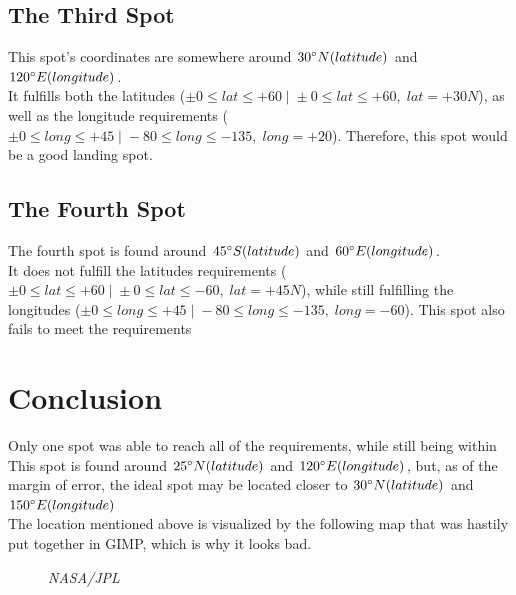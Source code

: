 \documentclass{article}
\newcommand*{\captionsource}[2]{%
    \caption*{%
        \noindent%
        {\fontsize{8pt}{8pt}%
            \selectfont \noindent \null \hfill \emph{#2}%
        }%
        \\\hspace{\linewidth}%
        {\fontsize{10pt}{10pt}%
            \selectfont \noindent \centering{#1}%
        }%
    }%
}
\begin{document}
\subsection{The Third Spot}
This spot's coordinates are somewhere around \(30 \degree N (latitude)\) and \(120 \degree E (longitude)\). \\
It fulfills both the latitudes (\(\pm 0 \leq lat \leq +60 \;|\; \pm 0 \leq lat \leq +60,\; lat = +30 N\)), as well as the longitude requirements (\(  \pm 0 \leq long \leq +45 \;|\; -80 \leq long \leq -135,\; long = +20 \)).
Therefore, this spot would be a good landing spot.

\subsection{The Fourth Spot}
The fourth spot is found around \(45 \degree S (latitude)\) and \(60 \degree E (longitude)\). \\
It does not fulfill the latitudes requirements (\(\pm 0 \leq lat \leq +60 \;|\; \pm 0 \leq lat \leq -60,\; lat = +45 N\)), while still fulfilling the longitudes (\(  \pm 0 \leq long \leq +45 \;|\; -80 \leq long \leq -135,\; long = -60 \)).
This spot also fails to meet the requirements

\section{Conclusion}
Only one spot was able to reach all of the requirements, while still being within
This spot is found around \(25 \degree N (latitude)\) and \(120 \degree E (longitude)\), but, as of the margin of error, the ideal spot may be located closer to \(30 \degree N (latitude)\) and \(150 \degree E (longitude)\)  \\
The location mentioned above is visualized by the following map that was hastily put together in GIMP, which is why it looks bad.

\begin{figure}[H]
    \captionsource{The Conclusion}{NASA/JPL}
    \label{fig:final}
\end{figure}
\end{document}
